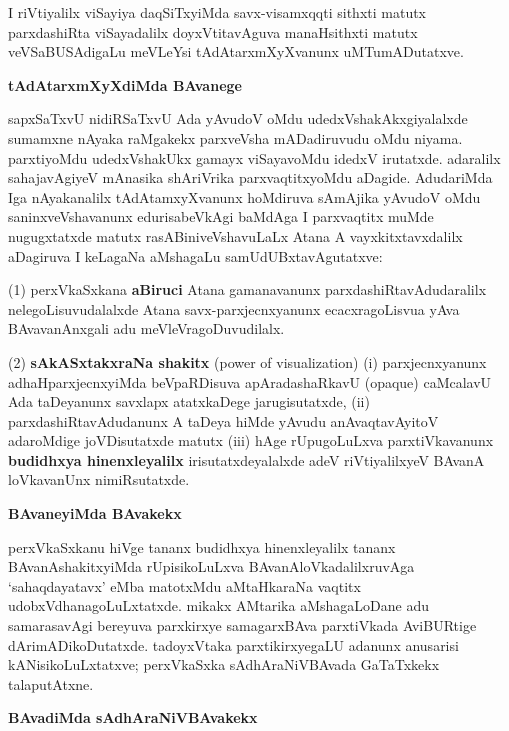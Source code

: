 I riVtiyalilx viSayiya daqSiTxyiMda savx-visamxqqti sithxti matutx parxdashiRta viSayadalilx doyxVtitavAguva manaHsithxti matutx veVSaBUSAdigaLu meVLeYsi tAdAtarxmXyXvanunx uMTumADutatxve.

\bigskip
\begin{center}
{\Large\bf tAdAtarxmXyXdiMda BAvanege}
\end{center}

sapxSaTxvU nidiRSaTxvU Ada yAvudoV oMdu udedxVshakAkxgiyalalxde sumamxne nAyaka raMgakekx parxveVsha mADadiruvudu oMdu niyama. parxtiyoMdu udedxVshakUkx gamayx viSayavoMdu idedxV irutatxde. adaralilx sahajavAgiyeV mAnasika shAriVrika parxvaqtitxyoMdu aDagide. AdudariMda Iga nAyakanalilx tAdAtamxyXvanunx hoMdiruva sAmAjika yAvudoV oMdu saninxveVshavanunx edurisabeVkAgi baMdAga I parxvaqtitx muMde nugugxtatxde matutx rasABiniveVshavuLaLx Atana A vayxkitxtavxdalilx aDagiruva I keLagaNa aMshagaLu samUdUBxtavAgutatxve:

(1) perxVkaSxkana {\bf aBiruci} Atana gamanavanunx parxdashiRtavAdudaralilx nelegoLisuvu\-dalalxde Atana savx-parxjecnxyanunx ecacxragoLisvua yAva BAvavanAnxgali adu meVleVragoDuvudilalx.

(2) {\bf sAkASxtakxraNa shakitx} {\rm(power of visualization)} {\rm(i)} parxjecnxyanunx adhaHparxjecnxyiMda beVpaRDisuva apAradashaRkavU {\rm(opaque)} caMcalavU Ada taDeyanunx savxlapx atatxkaDege jarugisutatxde, {\rm(ii)} parxdashiRtavAdudanunx A taDeya hiMde yAvudu anAvaqtavAyitoV adaroMdige joVDisutatxde matutx {\rm(iii)} hAge rUpugoLuLxva parxtiVkavanunx {\bf budidhxya hinenxleyalilx} irisutatxdeyalalxde adeV riVtiyalilxyeV BAvanA loVkavanUnx nimiRsutatxde.

\bigskip
\begin{center}
{\Large\bf BAvaneyiMda BAvakekx}
\end{center}

perxVkaSxkanu hiVge tananx budidhxya hinenxleyalilx tananx BAvanAshakitxyiMda rUpisikoLuLxva BAvanAloVkadalilxruvAga `sahaqdayatavx' eMba matotxMdu aMtaHkaraNa vaqtitx udobxV\-dhanagoLuLxtatxde. mikakx AMtarika aMshagaLoDane adu samarasavAgi bereyuva parxkirxye samagarxBAva parxtiVkada AviBURtige dArimADikoDutatxde. tadoyxVtaka parxtikirxyegaLU adanunx anusarisi kANisikoLuLxtatxve; perxVkaSxka sAdhAraNiVBAvada GaTaTxkekx talaputAtxne.

\newpage

\begin{center}
{\Large\bf BAvadiMda sAdhAraNiVBAvakekx}
\end{center}

